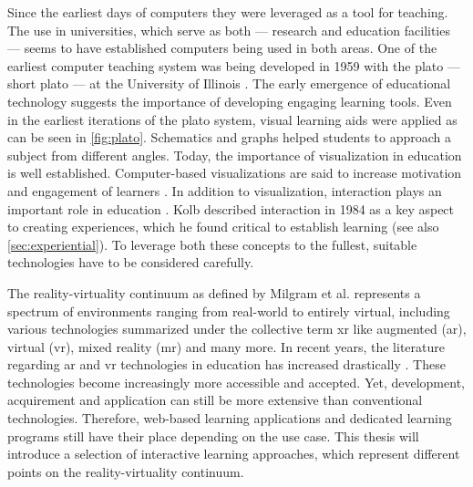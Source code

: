 Since the earliest days of computers they were leveraged as a tool for teaching.
The use in universities, which serve as both --- research and education facilities --- seems to have established computers being used in both areas.
One of the earliest computer teaching system was being developed in 1959 with the \acrlong{plato} --- short \acrshort{plato} --- at the University of Illinois \cite{cope2023history}.
The early emergence of educational technology suggests the importance of developing engaging learning tools.
Even in the earliest iterations of the \acrshort{plato} system, visual learning aids were applied as can be seen in \autoref{fig:plato}.
Schematics and graphs helped students to approach a subject from different angles.
Today, the importance of visualization in education is well established.
Computer-based visualizations are said to increase motivation and engagement of learners \cite{vavra2011visualization}.
In addition to visualization, interaction plays an important role in education \cite{firat2018towards}.
Kolb described interaction in 1984 \cite{kolb:1984:experiential} as a key aspect to creating experiences, which he found critical to establish learning (see also \autoref{sec:experiential}).
To leverage both these concepts to the fullest, suitable technologies have to be considered carefully.

The reality-virtuality continuum as defined by Milgram et al. \cite{milgram1994arc} represents a spectrum of environments ranging from real-world to entirely virtual, including various technologies summarized under the collective term \acrfull{xr} like augmented (\acrshort{ar}), virtual (\acrshort{vr}), mixed reality (\acrshort{mr}) and many more. In recent years, the literature regarding \acrshort{ar} and \acrshort{vr} technologies in education has increased drastically \cite{alansi2023analyzing}. These technologies become increasingly more accessible and accepted. Yet, development, acquirement and application can still be more extensive than conventional technologies. Therefore, web-based learning applications and dedicated learning programs still have their place depending on the use case. This thesis will introduce a selection of interactive learning approaches, which represent different points on the reality-virtuality continuum. 


